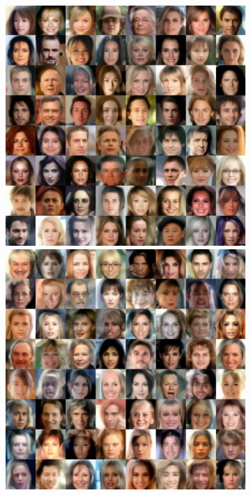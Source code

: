 \begin{figure}
  \begin{subfigure}{0.495\textwidth}
    \includegraphics[width=\linewidth]{figs/imgs/ddpm_ddpm_celeba64_data_samples_T_400_5_steps_ga.jpg}
    \includegraphics[width=\linewidth]{figs/imgs/ddpm_ddpm_celeba64_data_samples_T_300_3_steps_ga.jpg}

\end{subfigure}
\end{figure}
